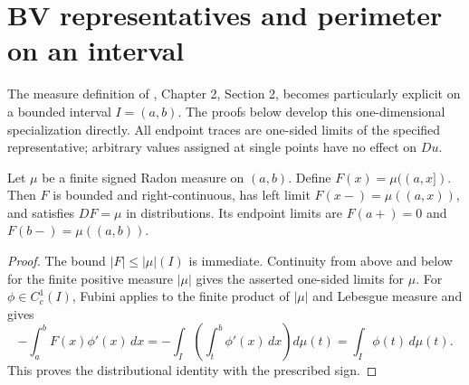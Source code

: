 \chapter{BV representatives and perimeter on an interval}\label{sec:bv-interval-structure}
The measure definition of \cite{Sim18}, Chapter 2, Section 2, becomes particularly explicit on a bounded interval $I=(a,b)$. The proofs below develop this one-dimensional specialization directly. All endpoint traces are one-sided limits of the specified representative; arbitrary values assigned at single points have no effect on $Du$.

\begin{lemma}\label{lem:interval-measure-primitive}
Let $\mu$ be a finite signed Radon measure on $(a,b)$. Define $F(x)=\mu((a,x])$. Then $F$ is bounded and right-continuous, has left limit $F(x-)=\mu((a,x))$, and satisfies $DF=\mu$ in distributions. Its endpoint limits are $F(a+)=0$ and $F(b-)=\mu((a,b))$.
\end{lemma}
\begin{proof}
The bound $|F|\leq|\mu|(I)$ is immediate. Continuity from above and below for the finite positive measure $|\mu|$ gives the asserted one-sided limits for $\mu$. For $\phi\in C_c^1(I)$, Fubini applies to the finite product of $|\mu|$ and Lebesgue measure and gives
\[
 -\int_a^bF(x)\phi'(x)\,dx
 =-\int_I\left(\int_t^b\phi'(x)\,dx\right)d\mu(t)
 =\int_I\phi(t)\,d\mu(t).
\]
This proves the distributional identity with the prescribed sign.
\end{proof}

